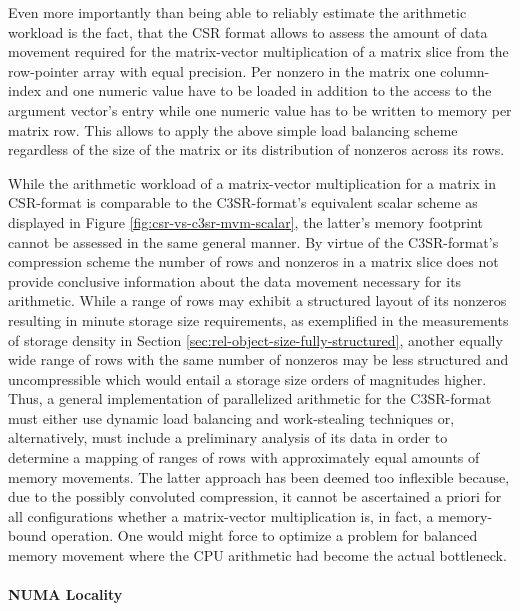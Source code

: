     Even more importantly than being able to reliably estimate the arithmetic workload is the fact, that the CSR format
    allows to assess the amount of data movement required for the matrix-vector multiplication of a matrix slice from
    the row-pointer array with equal precision. Per nonzero in the matrix one column-index and one numeric value have to
    be loaded in addition to the access to the argument vector's entry while one numeric value has to be written to memory
    per matrix row. This allows to apply the above simple load balancing scheme regardless of the size of the matrix or
    its distribution of nonzeros across its rows.

    While the arithmetic workload of a matrix-vector multiplication for a matrix in CSR-format is comparable to the
    C3SR-format's equivalent scalar scheme as displayed in Figure \ref{fig:csr-vs-c3sr-mvm-scalar}, the latter's memory
    footprint cannot be assessed in the same general manner. By virtue of the C3SR-format's compression scheme the
    number of rows and nonzeros in a matrix slice does not provide conclusive information about the data movement
    necessary for its arithmetic. While a range of rows may exhibit a structured layout of its nonzeros resulting in
    minute storage size requirements, as exemplified in the measurements of storage density in Section
    \ref{sec:rel-object-size-fully-structured}, another equally wide range of rows with the same number of nonzeros may
    be less structured and uncompressible which would entail a storage size orders of magnitudes higher. Thus, a general
    implementation of parallelized arithmetic for the C3SR-format must either use dynamic load balancing and
    work-stealing techniques or, alternatively, must include a preliminary analysis of its data in order to determine a
    mapping of ranges of rows with approximately equal amounts of memory movements. The latter approach has been deemed
    too inflexible because, due to the possibly convoluted compression, it cannot be ascertained a priori for all
    configurations whether a matrix-vector multiplication is, in fact, a memory-bound operation. One would might force
    to optimize a problem for balanced memory movement where the CPU arithmetic had become the actual bottleneck.

    \paragraph{NUMA Locality}

